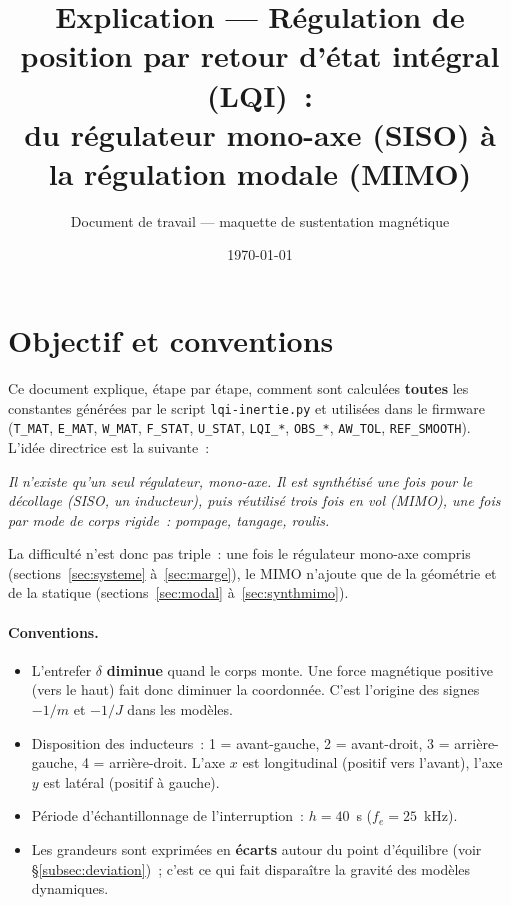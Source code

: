 \documentclass[a4paper,11pt]{article}
\title{Explication --- Régulation de position par retour d'état intégral (LQI)~:\\
du régulateur mono-axe (SISO) à la régulation modale (MIMO)}
\author{Document de travail --- maquette de sustentation magnétique}
\date{\today}
\begin{document}
\maketitle

\tableofcontents
\clearpage

\section{Objectif et conventions}

Ce document explique, étape par étape, comment sont calculées \textbf{toutes} les
constantes générées par le script \texttt{lqi-inertie.py} et utilisées dans le
firmware (\texttt{T\_MAT}, \texttt{E\_MAT}, \texttt{W\_MAT}, \texttt{F\_STAT},
\texttt{U\_STAT}, \texttt{LQI\_*}, \texttt{OBS\_*}, \texttt{AW\_TOL},
\texttt{REF\_SMOOTH}). L'idée directrice est la suivante~:

\begin{center}
\emph{Il n'existe qu'un seul régulateur, mono-axe. Il est synthétisé une fois
pour le décollage (SISO, un inducteur), puis réutilisé trois fois en vol
(MIMO), une fois par mode de corps rigide~: pompage, tangage, roulis.}
\end{center}

La difficulté n'est donc pas triple~: une fois le régulateur mono-axe compris
(sections~\ref{sec:systeme} à~\ref{sec:marge}), le MIMO n'ajoute que de la
géométrie et de la statique (sections~\ref{sec:modal} à~\ref{sec:synthmimo}).

\paragraph{Conventions.}
\begin{itemize}
    \item L'entrefer $\delta$ \textbf{diminue} quand le corps monte. Une force
          magnétique positive (vers le haut) fait donc diminuer la coordonnée.
          C'est l'origine des signes $-1/m$ et $-1/J$ dans les modèles.
    \item Disposition des inducteurs~: 1 = avant-gauche, 2 = avant-droit,
          3 = arrière-gauche, 4 = arrière-droit. L'axe $x$ est longitudinal
          (positif vers l'avant), l'axe $y$ est latéral (positif à gauche).
    \item Période d'échantillonnage de l'interruption~: $h = 40$~\textmu s
          ($f_e = 25$~kHz).
    \item Les grandeurs sont exprimées en \textbf{écarts} autour du point
          d'équilibre (voir §\ref{subsec:deviation})~; c'est ce qui fait
          disparaître la gravité des modèles dynamiques.
\end{itemize}
\end{document}
